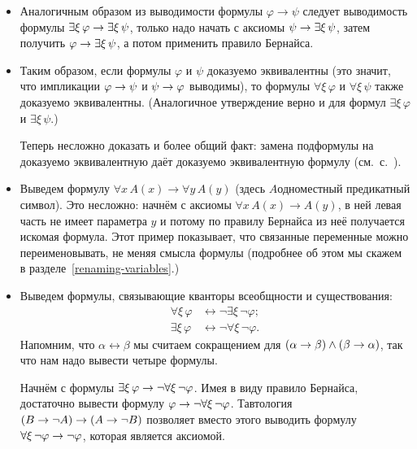 \begin{itemize}
воспользоваться правилом Бернайса (здесь важно, что $\xi$
не является параметром левой части).
        \item
Аналогичным образом из выводимости формулы $\varphi\to\psi$
следует выводимость формулы $\exists\xi\,\varphi\hm\to\exists\xi\,\psi$,
только надо начать с аксиомы $\psi\hm\to\exists\xi\,\psi$, затем
получить $\varphi\hm\to\exists\xi\,\psi$, а потом применить
правило Бернайса.
        \item
\label{adding-quantifiers}%
Таким образом, если формулы $\varphi$ и $\psi$ доказуемо
эквивалентны (это значит, что импликации $\varphi\hm\to\psi$ и
$\psi\hm\to\varphi$ выводимы), то формулы $\forall\xi\,\varphi$
и $\forall\xi\,\psi$ также доказуемо эквивалентны. (Аналогичное
утверждение верно и для формул $\exists\xi\,\varphi$ и
$\exists\xi\,\psi$.)

Теперь несложно доказать и более общий факт: замена подформулы
на доказуемо эквивалентную даёт доказуемо эквивалентную формулу
(см.~с.~\pageref{changing-parts}).

        \item
        \label{changing-variables-example}%
Выведем формулу $\forall x\, A(x) \to \forall y\, A(y)$ (здесь
$A$\т одноместный предикатный символ). Это несложно: начнём с
аксиомы $\forall x\, A(x) \to A(y)$, в ней левая часть не имеет
параметра $y$ и потому по правилу Бернайса из неё получается
искомая формула. Этот пример показывает, что связанные
переменные можно переименовывать, не меняя смысла формулы
(подробнее об этом мы скажем в
разделе~\ref{renaming-variables}.)

        \item
        \label{quantifier-duality}%
Выведем формулы, связывающие кванторы всеобщности и
существования:
\begin{align*}
\forall \xi\,\varphi &\leftrightarrow \lnot\exists\xi\,\lnot\varphi;\\
\exists \xi\,\varphi &\leftrightarrow \lnot\forall\xi\,\lnot\varphi.
\end{align*}
Напомним, что $\alpha\leftrightarrow\beta$ мы считаем
сокращением для ${(\alpha\to\beta)}\hm\land{(\beta\to\alpha)}$,
так что нам надо вывести четыре формулы.

Начнём с формулы $\exists\xi\,\varphi\hm\to
\lnot\forall\xi\,\lnot\varphi$. Имея в виду правило Бернайса,
достаточно вывести формулу
$\varphi\hm\to\lnot\forall\xi\,\lnot\varphi$. Тавтология
$(B\to \lnot A)\hm\to(A\to \lnot B)$ позволяет вместо этого выводить
формулу $\forall\xi\,\lnot\varphi\hm\to\lnot\varphi$, которая
является аксиомой.


\end{itemize}
